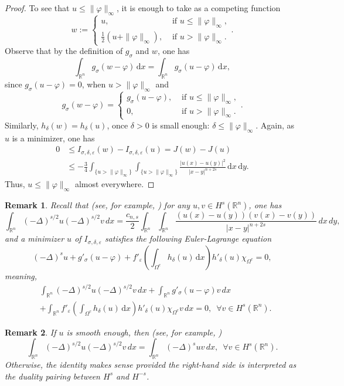 \documentclass[11pt, reqno]{amsart}
\newtheorem{remark}{Remark}
\numberwithin{equation}{section}
\numberwithin{theorem}{section}
\numberwithin{lemma}{section}
\numberwithin{corollary}{section}
\numberwithin{remark}{section}
\numberwithin{proposition}{section}
\numberwithin{definition}{section}
\newcommand{\R}{\mathbb{R}}
\begin{document}
\begin{proof}
	To see that $u\le\|\varphi\|_\infty$, it is enough to take as a competing function 
	\[
	w:=\begin{cases}
	u, &  \text{ if } u\le\|\varphi\|_\infty,\\ 
	\frac12\left(u+\|\varphi\|_\infty\right), & \text{ if }u>\|\varphi\|_\infty.
	\end{cases}.
	\] 
	Observe that by the definition of $g_\sigma$ and $w$, one has
	$$
	\int_{\R^n} g_\sigma(w-\varphi)\,\mathrm{d}x=\int_{\R^n} g_\sigma(u-\varphi)\,\mathrm{d}x,
	$$
	since $g_\sigma(u-\varphi)=0$, when $u>\|\varphi\|_\infty$ and
	\[
	g_\sigma(w-\varphi)=\begin{cases}
		g_\sigma(u-\varphi), & \text{ if } u\le\|\varphi\|_\infty,\\ 
		0, & \text{ if }u>\|\varphi\|_\infty.
	\end{cases}.
	\] 
	Similarly, $h_\delta(w)=h_\delta(u)$, once $\delta>0$ is small enough: $\delta\le\|\varphi\|_\infty$. Again, as $u$ is a minimizer, one has
    \begin{align*}
	0&\le I_{\sigma,\delta,\varepsilon}(w)-I_{\sigma,\delta,\varepsilon}(u)= J(w)-J(u)\\
	&\le-\frac34\int_{\{u>\|\varphi\|_\infty\}}\int_{\{u>\|\varphi\|_\infty\}}\frac{|u(x)-u(y)|^2}{|x-y|^{n+2s}}\,\mathrm{d}x\,\mathrm{d}y.
	\end{align*}
	Thus, $u\le\|\varphi\|_\infty$ almost everywhere.
\end{proof}
\begin{remark}\label{r2.1}
    Recall that (see, for example, \cite[Lemma 12.13]{S24})
    for any $u,v\in H^s(\R^n)$, one has
    $$
    \int_{\R^n}(-\Delta)^{s/2}u(-\Delta)^{s/2}v\,dx=\frac{c_{n,s}}{2}\int_{\R^n}\int_{\R^n}\frac{(u(x)-u(y))(v(x)-v(y))}{|x-y|^{n+2s}}\,dx\,dy,
    $$
    and a minimizer $u$ of $I_{\sigma,\delta,\varepsilon}$ satisfies the following Euler-Lagrange equation
    \begin{equation}\label{EL}
    (-\Delta)^su+g'_\sigma(u-\varphi)+f'_\varepsilon\left(\int_{\Omega^c} h_\delta(u)\,\mathrm{d}x\right)h'_\delta(u) \chi_{\Omega^c}=0,
    \end{equation} 
    meaning,     
    \begin{equation*}
        \begin{split}
            &\int_{\R^n}(-\Delta)^{s/2}u(-\Delta)^{s/2}v\,dx+\int_{\R^n}g'_\sigma(u-\varphi)v\,dx\\
            &+\int_{\R^n}f'_\varepsilon\left(\int_{\Omega^c} h_\delta(u)\,\mathrm{d}x\right)h'_\delta(u)\chi_{\Omega^c}v\,dx=0,\,\,\,\forall v\in H^s{(\R^n)}.
        \end{split}
    \end{equation*}
\end{remark}
\begin{remark}\label{new remark}
    If $u$ is smooth enough, then (see, for example, \cite{S24})
    $$
    \int_{\R^n}(-\Delta)^{s/2}u(-\Delta)^{s/2}v\,dx=\int_{\R^n}(-\Delta)^suv\,dx,\,\,\,\forall v\in H^s(\R^n).
    $$
    Otherwise, the identity makes sense provided the right-hand side is interpreted as the duality pairing between $H^s$ and $H^{-s}$.    
\end{remark}
\end{document}
